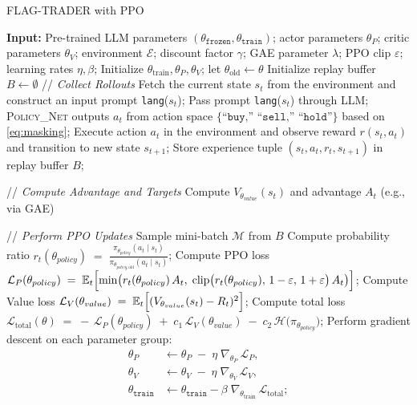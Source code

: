 \begin{algorithm}[H]
\caption{FLAG-TRADER with PPO}
\label{alg:flagtrader-ppo}
\begin{algorithmic}[1]
\STATE \textbf{Input:} Pre-trained LLM parameters $(\theta_{\texttt{frozen}}, \theta_{\texttt{train}})$; actor parameters $\theta_P$; critic parameters $\theta_V$; environment $\mathcal{E}$; discount factor $\gamma$; GAE parameter $\lambda$; PPO clip $\varepsilon$; learning rates $\eta, \beta$;
\STATE Initialize $\theta_{\text{train}}, \theta_P, \theta_V$; let $\theta_{\mathrm{old}} \leftarrow \theta$
\STATE Initialize replay buffer $B \leftarrow \emptyset$
  \STATE // \textit{Collect Rollouts}
    \STATE Fetch the current state $s_t$ from the environment and construct an input prompt \texttt{lang}($s_t$);
    \STATE Pass prompt \texttt{lang}($s_t$) through LLM;
    \STATE \textsc{Policy\_Net} outputs $a_t$ from action space $\{\texttt{``buy,'' ``sell,'' ``hold''}\}$ based on \eqref{eq:masking};
    \STATE Execute action $a_t$ in the environment and observe reward $r(s_t, a_t)$ and transition to new state $s_{t+1}$;
    \STATE Store experience tuple $(s_t, a_t, r_t, s_{t+1})$ in replay buffer $B$;
    
  \ENDFOR

  \STATE // \textit{Compute Advantage and Targets}
    \STATE Compute $V_{\theta_{value}}(s_t)$ and advantage $A_t$ (e.g., via GAE)
  \ENDFOR

  \STATE // \textit{Perform PPO Updates}
    \STATE Sample mini-batch $\mathcal{M}$ from $B$
    \STATE Compute probability ratio $r_t(\theta_{policy}) \;=\; \frac{\pi_{\theta_{policy}}(a_t \mid s_t)}{\pi_{\theta_{policy,\mathrm{old}}}(a_t \mid s_t)}$;
    \STATE Compute PPO loss $\mathcal{L}_P(\theta_{policy}) \;=\; \mathbb{E}_t \Bigl[
  \min\bigl(r_t(\theta_{policy})\,A_t,\; \text{clip}\bigl(r_t(\theta_{policy}),\,1-\varepsilon,\,1+\varepsilon\bigr)\,A_t\bigr)
\Bigr]$;
    \STATE Compute Value loss $\mathcal{L}_{V}(\theta_{value}) \;=\; \mathbb{E}_t\Bigl[(V_{\theta_{value}}(s_t) - R_t)^2\Bigr]$;
    \STATE Compute total loss $\mathcal{L}_{\text{total}}(\theta)
\;=\;
-\,\mathcal{L}_{P}(\theta_{policy})
\;+\;
c_1\,\mathcal{L}_{V}(\theta_{value})
\;-\;
c_2\,\mathcal{H}\bigl(\pi_{\theta_{policy}}\bigr)$;
    \STATE Perform gradient descent on each parameter group:
    \begin{align*}
\theta_P       &\leftarrow \theta_P       \;-\; \eta \;\nabla_{\theta_P}\,\mathcal{L}_P, \\
\theta_V       &\leftarrow \theta_V       \;-\; \eta \;\nabla_{\theta_V}\,\mathcal{L}_V, \\
\theta_{\texttt{train}} &\leftarrow \theta_{\texttt{train}} - \beta \;\nabla_{\theta_{\text{train}}}\,\mathcal{L}_{\text{total}};
\end{align*}
  \ENDFOR


\end{algorithmic}
\end{algorithm}
